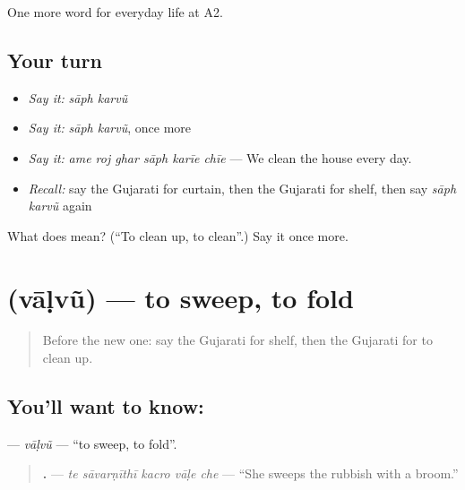 \begin{grammarlens}[title={What you've built}]
One more word for everyday life at A2.
\end{grammarlens}

\subsection*{Your turn}
\begin{itemize}
\raggedright
  \item \emph{Say it:} \emph{sāph karvũ}
  \item \emph{Say it:} \emph{sāph karvũ}, once more
  \item \emph{Say it:} \emph{ame roj ghar sāph karīe chīe} — We clean the house every day.
  \item \emph{Recall:} say the Gujarati for curtain, then the Gujarati for shelf, then say \emph{sāph karvũ} again
\end{itemize}

\begin{tcolorbox}[breakable,colback=teal!4,colframe=teal!35!black,title={Before you move on}]
What does   mean? (\textquotedblleft{}To clean up, to clean\textquotedblright{}.) Say it once more.
\end{tcolorbox}
\section[\texorpdfstring{\gu{વાળવું} (vāḷvũ)}{વાળવું (vāḷvũ)}]{ (vāḷvũ) — to sweep, to fold}

\label{lesson:GU-C158-valvu}



\begin{quote}
Before the new one: say the Gujarati for shelf, then the Gujarati for to clean up.
\end{quote}

\subsection*{You'll want to know: }
\textbf{} — \emph{vāḷvũ} — \textquotedblleft{}to sweep, to fold\textquotedblright{}.

\begin{quote}
\textbf{    .} — \emph{te sāvarṇīthī kacro vāḷe che} — \textquotedblleft{}She sweeps the rubbish with a broom.\textquotedblright{}
\end{quote}

